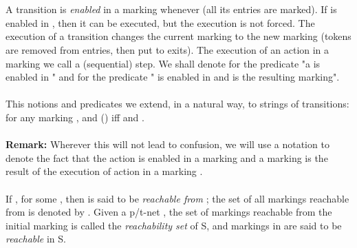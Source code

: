 \documentclass[a4paper]{llncs}
\begin{document}
\\ \\
A transition  is \emph{enabled} in a marking  whenever  (all its entries are marked). If  is enabled in , then it can be executed, but the execution is not forced. The execution of a transition  changes the current marking  to the new marking  (tokens are removed from entries, then put to exits). The execution of an action  in a marking  we call a (sequential) step. We shall denote  for the predicate "a is enabled in " and  for the predicate " is enabled in  and  is the resulting marking".
\\ \\
This notions and predicates we extend, in a natural way, to strings of transitions:  for any marking , and   () iff  and  .
\\ \\
\textbf{Remark:} Wherever this will not lead to confusion, we will use a notation  to denote the fact that the action  is enabled in a marking  and a marking  is the result of the execution of action  in a marking .
\\ \\
If , for some , then  is said to be \emph{reachable from }; the set of all markings reachable from  is denoted by  . Given a p/t-net , the set  of markings reachable from the initial marking  is called the \emph{reachability set} of S, and markings in   are said to be \emph{reachable} in S.
\end{document}
